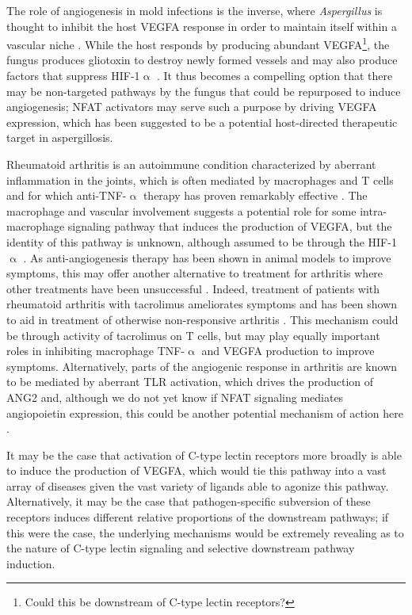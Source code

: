 The role of angiogenesis in mold infections is the inverse, where \textit{Aspergillus} is thought to inhibit the host VEGFA response in order to maintain itself within a vascular niche \citep{Kontoyiannis2010}. While the host responds by producing abundant VEGFA\footnote{Could this be downstream of C\hyp{}type lectin receptors?}, the fungus produces gliotoxin to destroy newly formed vessels and may also produce factors that suppress HIF\hyp{}1$\upalpha$ \citep{BenAmi2013}. It thus becomes a compelling option that there may be non\hyp{}targeted pathways by the fungus that could be repurposed to induce angiogenesis; NFAT activators may serve such a purpose by driving VEGFA expression, which has been suggested to be a potential host\hyp{}directed therapeutic target in aspergillosis.

Rheumatoid arthritis is an autoimmune condition characterized by aberrant inflammation in the joints, which is often mediated by macrophages and T cells and for which anti\hyp{}TNF\hyp{}$\upalpha$ therapy has proven remarkably effective \citep{Feldmann2002}. The macrophage and vascular involvement suggests a potential role for some intra\hyp{}macrophage signaling pathway that induces the production of VEGFA, but the identity of this pathway is unknown, although assumed to be through the HIF\hyp{}1$\upalpha$ \citep{MacDonald2018}. As anti\hyp{}angiogenesis therapy has been shown in animal models to improve symptoms, this may offer another alternative to treatment for arthritis where other treatments have been unsuccessful \citep{Paleolog2002, Elshabrawy2015}. Indeed, treatment of patients with rheumatoid arthritis with tacrolimus ameliorates symptoms and has been shown to aid in treatment of otherwise non\hyp{}responsive arthritis \citep{Dutta2011}. This mechanism could be through activity of tacrolimus on T cells, but may play equally important roles in inhibiting macrophage TNF\hyp{}$\upalpha$ and VEGFA production to improve symptoms. Alternatively, parts of the angiogenic response in arthritis are known to be mediated by aberrant TLR activation, which drives the production of ANG2 and, although we do not yet know if NFAT signaling mediates angiopoietin expression, this could be another potential mechanism of action here \citep{Saber2011}.

It may be the case that activation of C\hyp{}type lectin receptors more broadly is able to induce the production of VEGFA, which would tie this pathway into a vast array of diseases given the vast variety of ligands able to agonize this pathway. Alternatively, it may be the case that pathogen\hyp{}specific subversion of these receptors induces different relative proportions of the downstream pathways; if this were the case, the underlying mechanisms would be extremely revealing as to the nature of C\hyp{}type lectin signaling and selective downstream pathway induction. 

